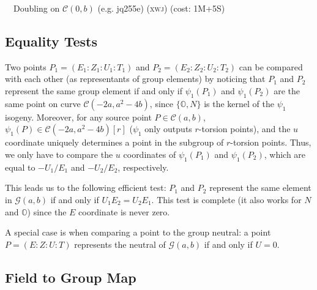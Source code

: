 \documentclass{llncs}
\newcommand{\cC}{\mathcal{C}}
\newcommand{\cG}{\mathcal{G}}
\newcommand{\neutral}{\mathbb{O}}
\newcommand{\xwj}{\textsc{xwj}\xspace}
\begin{document}
\begin{algorithm}[H]
    \caption{\ \ Doubling on $\cC(0,b)$ (e.g. jq255e) (\xwj) (cost: 1M+5S)}\label{alg:double-xwj-jq255e}
    \begin{algorithmic}[1]
        \Require{$P = (X{:}W{:}J) \in \cC(0,-2)$}
    \end{algorithmic}
\end{algorithm}

\subsection{Equality Tests}

Two points $P_1 = (E_1{:}Z_1{:}U_1{:}T_1)$ and
$P_2 = (E_2{:}Z_2{:}U_2{:}T_2)$ can be compared with each other (as
representants of group elements) by
noticing that $P_1$ and $P_2$ represent the same group element if and
only if $\psi_1(P_1)$ and $\psi_1(P_2)$ are the same point on curve
$\cC(-2a, a^2-4b)$, since $\{\neutral, N\}$ is the kernel of the
$\psi_1$ isogeny. Moreover, for any source point $P \in \cC(a,b)$,
$\psi_1(P) \in \cC(-2a, a^2-4b)[r]$ ($\psi_1$ only outputs $r$-torsion
points), and the $u$ coordinate uniquely determines a point in the
subgroup of $r$-torsion points. Thus, we only have to compare the
$u$ coordinates of $\psi_1(P_1)$ and $\psi_1(P_2)$, which are equal
to $-U_1/E_1$ and $-U_2/E_2$, respectively.

This leads us to the following efficient test: $P_1$ and $P_2$ represent
the same element in $\cG(a,b)$ if and only if $U_1 E_2 = U_2 E_1$. This
test is complete (it also works for $N$ and $\neutral$) since the
$E$ coordinate is never zero.

A special case is when comparing a point to the group neutral: a point
$P = (E{:}Z{:}U{:}T)$ represents the neutral of $\cG(a,b)$ if and only
if $U = 0$.

\subsection{Field to Group Map}\label{sec:map-to-curve}
\end{document}
